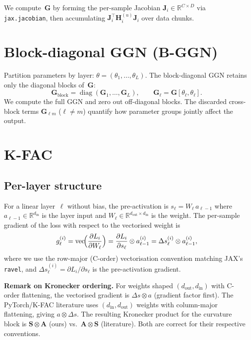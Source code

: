 \documentclass[11pt]{article}
\DeclareMathOperator{\diag}{diag}
\DeclareMathOperator{\vect}{vec}
\newcommand{\R}{\mathbb{R}}
\newcommand{\kron}{\otimes}
\begin{document}
We compute~$\mathbf{G}$ by forming the per-sample Jacobian
$\mathbf{J}_i\in\R^{C\times D}$ via \texttt{jax.jacobian}, then
accumulating $\mathbf{J}_i^\top \mathbf{H}_i^{(u)} \mathbf{J}_i$
over data chunks.

\section{Block-diagonal GGN (B-GGN)}

Partition parameters by layer:
$\theta=(\theta_1,\dots,\theta_L)$.  The block-diagonal GGN retains
only the diagonal blocks of~$\mathbf{G}$:
\[
  \mathbf{G}_{\text{block}} = \diag(\mathbf{G}_1,\dots,\mathbf{G}_L),
  \qquad
  \mathbf{G}_\ell = \mathbf{G}[\theta_\ell,\theta_\ell].
\]
We compute the full GGN and zero out off-diagonal blocks. The
discarded cross-block terms $\mathbf{G}_{\ell m}$ ($\ell\neq m$)
quantify how parameter groups jointly affect the output.

\section{K-FAC}

\subsection{Per-layer structure}

For a linear layer~$\ell$ without bias, the pre-activation is
$s_\ell = W_\ell\, a_{\ell-1}$ where $a_{\ell-1}\in\R^{d_{\text{in}}}$
is the layer input and $W_\ell\in\R^{d_{\text{out}}\times d_{\text{in}}}$
is the weight.  The per-sample gradient of the loss with respect to the
vectorised weight is
\[
  g_\ell^{(i)} = \vect\!\Bigl(\frac{\partial L_i}{\partial W_\ell}\Bigr)
  = \frac{\partial L_i}{\partial s_\ell} \kron a_{\ell-1}^{(i)}
  = \Delta s_\ell^{(i)} \kron a_{\ell-1}^{(i)},
\]
where we use the row-major (C-order) vectorisation convention matching
JAX's \texttt{ravel}, and $\Delta s_\ell^{(i)} =
\partial L_i/\partial s_\ell$ is the pre-activation gradient.

\medskip
\noindent\textbf{Remark on Kronecker ordering.}\quad
For weights shaped $(d_{\text{out}}, d_{\text{in}})$ with C-order
flattening, the vectorised gradient is
$\Delta s \kron a$ (gradient factor first).
The PyTorch/K-FAC literature uses $(d_{\text{in}}, d_{\text{out}})$
weights with column-major flattening, giving $a\kron\Delta s$.
The resulting Kronecker product for the curvature block is
$\mathbf{S}\kron\mathbf{A}$ (ours) vs.\
$\mathbf{A}\kron\mathbf{S}$ (literature).
Both are correct for their respective conventions.
\end{document}
